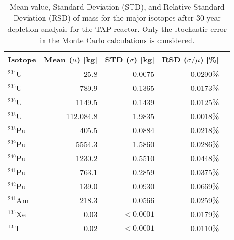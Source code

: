 \begin{table}[htp!]
	\centering
	\caption{Mean value, Standard Deviation (STD), and Relative Standard 
		Deviation (RSD) of mass for the major isotopes after 30-year depletion 
		analysis for the \gls{TAP} reactor. Only the stochastic error in the 
		Monte 
		Carlo calculations is considered.}
	\begin{tabularx}{0.7\textwidth}{L R R R R}
		\hline
		\textbf{Isotope}  & \textbf{Mean ($\mu$) [kg]} & \textbf{STD 
			($\sigma$) [kg]} & \textbf{RSD ($\sigma/\mu$) [\%]}\\ \hline
		$^{234}$U  & 25.8  & 0.0075 & 0.0290\% \\
		$^{235}$U  & 789.9 & 0.1365 & 0.0173\% \\
		$^{236}$U  & 1149.5& 0.1439 & 0.0125\% \\
		$^{238}$U  & 112,084.8 & 1.9835 & 0.0018\% \\
		$^{238}$Pu & 405.5 & 0.0884 & 0.0218\% \\
		$^{239}$Pu & 5554.3& 1.5860 & 0.0286\% \\
		$^{240}$Pu & 1230.2& 0.5510 & 0.0448\% \\
		$^{241}$Pu & 763.1 & 0.2859 & 0.0375\% \\
		$^{242}$Pu & 139.0 & 0.0930  & 0.0669\% \\
		$^{241}$Am & 218.3 & 0.0566  & 0.0259\% \\
		$^{135}$Xe & 0.03  & $<0.0001$& 0.0179\% \\
		$^{135}$I  & 0.02  & $<0.0001$& 0.0110\% \\ \hline
	\end{tabularx}
	\label{tab:uq-serpent-mean-std-rsd}
	\vspace{-0.9em}
\end{table}

